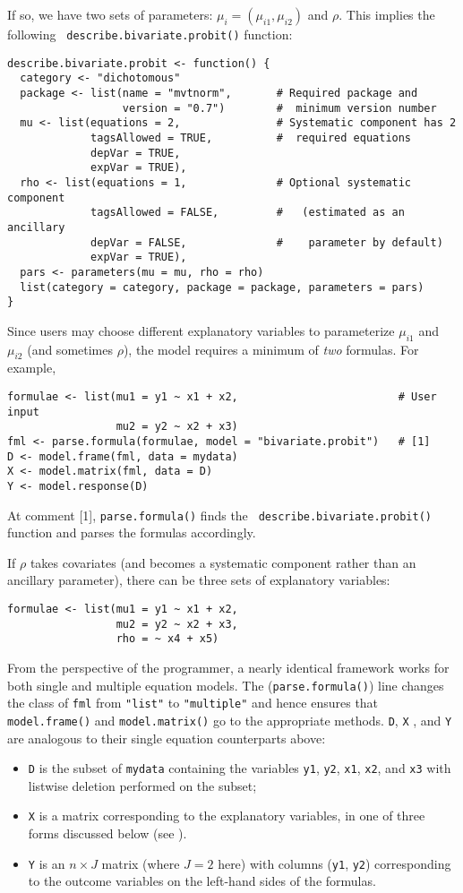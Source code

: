 If so, we have two sets of parameters: $\mu_{i} = (\mu_{i1},
\mu_{i2})$ and $\rho$.  This implies the following {\tt
describe.bivariate.probit()} function:
\begin{verbatim}
describe.bivariate.probit <- function() {
  category <- "dichotomous"
  package <- list(name = "mvtnorm",       # Required package and 
                  version = "0.7")        #  minimum version number
  mu <- list(equations = 2,               # Systematic component has 2
             tagsAllowed = TRUE,          #  required equations
             depVar = TRUE, 
             expVar = TRUE), 
  rho <- list(equations = 1,              # Optional systematic component
             tagsAllowed = FALSE,         #   (estimated as an ancillary
             depVar = FALSE,              #    parameter by default)
             expVar = TRUE), 
  pars <- parameters(mu = mu, rho = rho)
  list(category = category, package = package, parameters = pars)
}
\end{verbatim}

Since users may choose different explanatory variables to parameterize
$\mu_{i1}$ and $\mu_{i2}$ (and sometimes $\rho$), the model requires a
minimum of \emph{two} formulas.  For example,
\begin{verbatim}
formulae <- list(mu1 = y1 ~ x1 + x2,                         # User input
                 mu2 = y2 ~ x2 + x3)
fml <- parse.formula(formulae, model = "bivariate.probit")   # [1]
D <- model.frame(fml, data = mydata)
X <- model.matrix(fml, data = D)
Y <- model.response(D)
\end{verbatim}
At comment [1], {\tt parse.formula()} finds the {\tt
describe.bivariate.probit()} function and parses the formulas
accordingly.  

If $\rho$ takes covariates (and becomes a systematic component rather
than an ancillary parameter), there can be three sets of explanatory variables:  
\begin{verbatim}
formulae <- list(mu1 = y1 ~ x1 + x2, 
                 mu2 = y2 ~ x2 + x3, 
                 rho = ~ x4 + x5) 
\end{verbatim}

From the perspective of the programmer, a nearly identical
framework works for both single and multiple equation
models.  The ({\tt parse.formula()}) line changes the class
of {\tt fml} from {\tt "list"} to {\tt "multiple"} and hence ensures
that {\tt model.frame()} and {\tt model.matrix()} go to the
appropriate methods.  {\tt D}, {\tt X} , and {\tt Y} are analogous to their
single equation counterparts above:
\begin{itemize}
\item  {\tt D} is the subset of {\tt mydata} containing the variables
{\tt y1}, {\tt y2}, {\tt x1}, {\tt x2}, and {\tt x3} with listwise
deletion performed on the subset; 
\item {\tt X} is a matrix corresponding to the explanatory variables,
in one of three forms discussed below (see ).  
\item {\tt Y} is an $n \times J$  matrix (where $J=2$ here) with
columns ({\tt y1}, {\tt y2}) corresponding to the outcome variables on
the left-hand sides of the formulas.  
\end{itemize}

